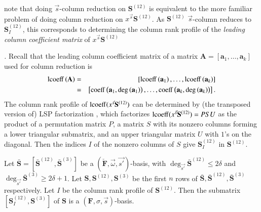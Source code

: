 note that doing $\vec{s}$-column reduction on $\mathbf{S}^{\left(12\right)}$
is equivalent to the more familiar problem of doing column reduction
on $x^{\vec{s}}\mathbf{S}^{\left(12\right)}$. As $\mathbf{S}^{\left(12\right)}$
$\vec{s}$-column reduces to \textbf{$\mathbf{S}_{I}^{\left(12\right)}$},
this corresponds to determining the column rank profile of the\emph{
leading column coefficient matrix }of\emph{ }\textbf{$x^{\vec{s}}\mathbf{S}^{\left(12\right)}$}%
\begin{comment}
\emph{ }$S^{\left(12\right)}=\lcoeff(x^{\vec{s}}\cdot\mathbf{S}^{\left(12\right)})$ 
\end{comment}
{}\emph{. }Recall that the leading column coefficient matrix of a matrix
$\mathbf{A}=\left[\mathbf{a}_{1},\dots,\mathbf{a}_{k}\right]$ used
for column reduction is\emph{ \begin{eqnarray*}
\operatorname{lcoeff}\left(\mathbf{A}\right) & = & \left[\operatorname{lcoeff}\left(\mathbf{a}_{1}\right),\dots,\operatorname{lcoeff}\left(\mathbf{a}_{k}\right)\right]\\
 & = & \left[\operatorname{coeff}\left(\mathbf{a}_{1},\deg\left(\mathbf{a}_{1}\right)\right),\dots,\operatorname{coeff}\left(\mathbf{a}_{k},\deg\left(\mathbf{a}_{k}\right)\right)\right].\end{eqnarray*}
 }The column rank profile of $\operatorname{lcoeff}(x^{\vec{s}}\mathbf{S}^{\left(12\right)})$
can be determined by (the transposed version of) LSP factorization\emph{
\citep{IbarraMH82}}, which factorizes $\operatorname{lcoeff}(x^{\vec{s}}\mathbf{S}^{\left(12\right)})=PSU$
as the product of a permutation matrix $P$, a matrix $S$ with its
nonzero columns forming a lower triangular submatrix, and an upper
triangular matrix $U$ with $1$'s on the diagonal. Then the indices
$I$ of the nonzero columns of $S$ give $\mathbf{S}_{I}^{\left(12\right)}$
in $\mathbf{S}^{\left(12\right)}$. 
\begin{thm}
\label{thm:mainTheorem}Let $\bar{\mathbf{S}}=[\bar{\mathbf{S}}^{\left(12\right)},\bar{\mathbf{S}}^{\left(3\right)}]$
be a $(\check{\mathbf{F}},\vec{\omega},\vec{s'})$-basis, with $\deg_{\vec{s'}}\bar{\mathbf{S}}^{\left(12\right)}\le2\delta$
and $\deg_{\vec{s'}}\bar{\mathbf{S}}^{\left(3\right)}\ge2\delta+1$.
Let $\mathbf{S},\mathbf{S}^{\left(12\right)},\mathbf{S}^{\left(3\right)}$
be the first $n$ rows of $\bar{\mathbf{S}},\bar{\mathbf{S}}^{\left(12\right)},\bar{\mathbf{S}}^{\left(3\right)}$
respectively. Let $I$ be the column rank profile of $\mathbf{S}^{\left(12\right)}$.
Then the submatrix\textbf{ $[\mathbf{S}_{I}^{\left(12\right)},\mathbf{S}^{\left(3\right)}]$
}of $\mathbf{S}$ is a $\left(\mathbf{F},\sigma,\vec{s}\right)$-basis. \end{thm}
